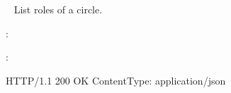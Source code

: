 \documentclass[letterpaper,10pt,english]{sphinxmanual}
\begin{document}
\begin{fulllineitems}
\label{\detokenize{resources/circle:get--circles-(circle_id)-roles}}~
List roles of a circle.

:

\begin{sphinxVerbatim}[commandchars=\\\{\}]
  
 
 
\end{sphinxVerbatim}

:

\begin{sphinxVerbatim}[commandchars=\\\{\}]
HTTP/1.1 200 OK
Content\PYGZhy{}Type: application/json


\end{sphinxVerbatim}
\end{fulllineitems}
\end{document}
